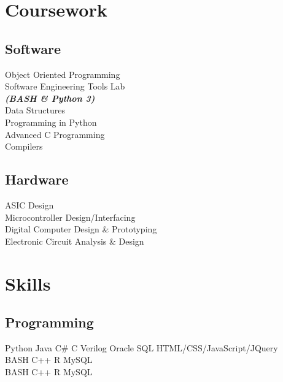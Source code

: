 \documentclass[letterpaper]{deedy-resume} %
\begin{document}
\begin{minipage}[t]{0.33\textwidth}
\section{Coursework}



\subsection{Software}

Object Oriented Programming \\
Software Engineering Tools Lab \\
{\footnotesize \textit{\textbf{(BASH \& Python 3) }}} \\
Data Structures \\
Programming in Python \\
Advanced C Programming \\
Compilers
\sectionsep
\subsection{Hardware}
ASIC Design \\
Microcontroller Design/Interfacing \\
Digital Computer Design \& Prototyping \\
Electronic Circuit Analysis \& Design \\

\sectionsep %


\section{Skills}

\subsection{Programming}

Python \textbullet{} Java \textbullet{} C\# \textbullet{} C \textbullet{} Verilog \textbullet{} Oracle SQL \textbullet{} HTML/CSS/JavaScript/JQuery \textbullet{} \\
BASH \textbullet{} C++ \textbullet{} R \textbullet{} MySQL \textbullet{}\\
BASH \textbullet{} C++ \textbullet{} R \textbullet{} MySQL\\
\sectionsep


\end{minipage}
\end{document}
